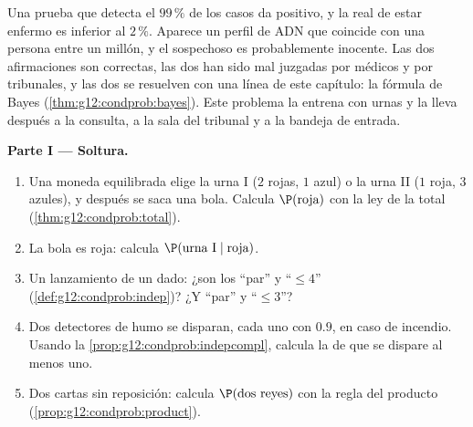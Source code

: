 \begin{problem}
\label{pb:g12:condprob:1}
Una prueba que detecta el $99\,\%$ de los casos da positivo, y la
 real de estar enfermo es inferior al $2\,\%$. Aparece un
perfil de ADN que coincide con una persona entre un millón, y el
sospechoso es probablemente inocente. Las dos afirmaciones son correctas,
las dos han sido mal juzgadas por médicos y por tribunales, y las dos se
resuelven con una línea de este capítulo: la fórmula de Bayes
(\cref{thm:g12:condprob:bayes}). Este problema la entrena con urnas y la
lleva después a la consulta, a la sala del tribunal y a la bandeja de
entrada.

\medskip
\noindent\textbf{Parte I --- Soltura.}
\begin{enumerate}
  \item Una moneda equilibrada elige la urna I ($2$ rojas, $1$ azul) o la
        urna II ($1$ roja, $3$ azules), y después se saca una bola. Calcula
        $\P(\text{roja})$ con la ley de la  total
        (\cref{thm:g12:condprob:total}).
  \item La bola es roja: calcula
        $\P(\text{urna I} \mid \text{roja})$.
  \item Un lanzamiento de un dado: ¿son  los  ``par''
        y ``$\leq 4$'' (\cref{def:g12:condprob:indep})? ¿Y ``par'' y
        ``$\leq 3$''?
  \item Dos detectores de humo  se disparan, cada uno con
         $0.9$, en caso de incendio. Usando la
        \cref{prop:g12:condprob:indepcompl}, calcula la  de que
        se dispare al menos uno.
  \item Dos cartas sin reposición: calcula $\P(\text{dos reyes})$ con la
        regla del producto (\cref{prop:g12:condprob:product}).
\end{enumerate}


\end{problem}
